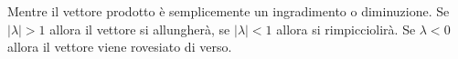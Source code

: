 \documentclass{rapport}
\begin{document}
\begin{figure}[htbp]
    
\end{figure}

Mentre il vettore prodotto è semplicemente un ingradimento o diminuzione. Se $|\lambda|> 1$  allora il vettore si allungherà, se $|\lambda|< 1$ allora si rimpicciolirà. Se $\lambda < 0$ allora il vettore viene rovesiato di verso. 
\end{document}
